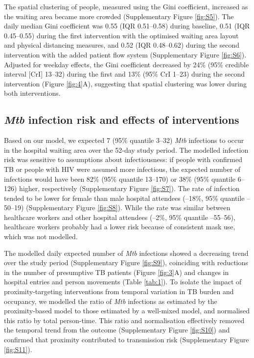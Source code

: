 \documentclass[11pt]{article}
\begin{document}
The spatial clustering of people, measured using the Gini coefficient, increased as the waiting area became more crowded (Supplementary Figure \ref{fig:S5}). The daily median Gini coefficient was 0.55 (IQR 0.51--0.58) during baseline, 0.51 (IQR 0.45--0.55) during the first intervention with the optimised waiting area layout and physical distancing measures, and 0.52 (IQR 0.48--0.62) during the second intervention with the added patient flow system (Supplementary Figure \ref{fig:S6}). Adjusted for weekday effects, the Gini coefficient decreased by 24\% (95\% credible interval {[}CrI{]} 13--32) during the first and 13\% (95\% CrI 1--23) during the second intervention (Figure \ref{fig:4}A), suggesting that spatial clustering was lower during both interventions.

\subsection{\texorpdfstring{\emph{Mtb} infection risk and effects of interventions}{Mtb infection risk and effects of interventions}}\label{mtb-infection-risk-and-effects-of-interventions}

Based on our model, we expected 7 (95\% quantile 3--32) \emph{Mtb} infections to occur in the hospital waiting area over the 52-day study period. The modelled infection risk was sensitive to assumptions about infectiousness: if people with confirmed TB or people with HIV were assumed more infectious, the expected number of infections would have been 82\% (95\% quantile 13--170) or 38\% (95\% quantile 6--126) higher, respectively (Supplementary Figure \ref{fig:S7}). The rate of infection tended to be lower for female than male hospital attendees (--18\%, 95\% quantile --50--19) (Supplementary Figure \ref{fig:S8}). While the rate was similar between healthcare workers and other hospital attendees (--2\%, 95\% quantile --55--56), healthcare workers probably had a lower risk because of consistent mask use, which was not modelled.

The modelled daily expected number of \emph{Mtb} infections showed a decreasing trend over the study period (Supplementary Figure \ref{fig:S9}), coinciding with reductions in the number of presumptive TB patients (Figure \ref{fig:3}A) and changes in hospital entries and person movements (Table \ref{tab:1}). To isolate the impact of proximity-targeting interventions from temporal variation in TB burden and occupancy, we modelled the ratio of \emph{Mtb} infections as estimated by the proximity-based model to those estimated by a well-mixed model, and normalised this ratio by total person-time. This ratio and normalisation effectively removed the temporal trend from the outcome (Supplementary Figure \ref{fig:S10}) and confirmed that proximity contributed to transmission risk (Supplementary Figure \ref{fig:S11}).
\end{document}
